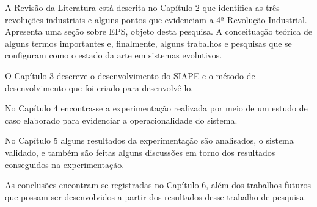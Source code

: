 A Revisão da Literatura está descrita no Capítulo 2 que identifica as três revoluções industriais e alguns pontos que evidenciam a 4ª Revolução Industrial. Apresenta uma seção sobre EPS, objeto desta pesquisa. A conceituação teórica de alguns termos importantes e, finalmente, alguns trabalhos e pesquisas que se configuram como o estado da arte em sistemas evolutivos.

O Capítulo 3 descreve o desenvolvimento do SIAPE  e o método de desenvolvimento que foi criado para desenvolvê-lo.

No Capítulo 4 encontra-se a experimentação realizada por meio de um estudo de caso elaborado para evidenciar a operacionalidade do sistema.

No Capítulo 5 alguns resultados da experimentação são analisados, o sistema validado, e também são feitas alguns discussões em torno dos  resultados conseguidos na experimentação.

As conclusões encontram-se registradas no Capítulo 6, além dos trabalhos futuros que possam ser desenvolvidos a partir dos resultados desse trabalho de pesquisa.